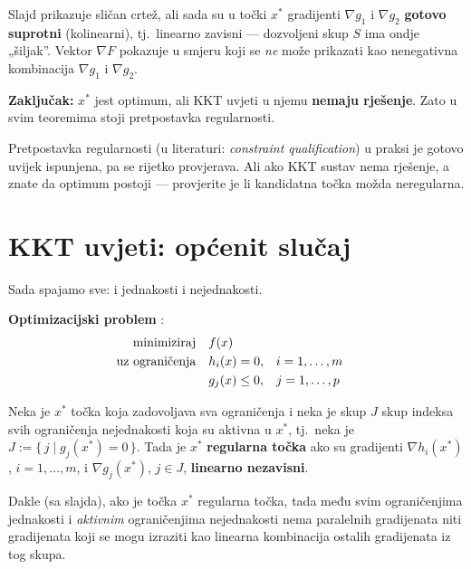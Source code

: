 Slajd prikazuje sličan crtež, ali sada su u točki $x^{*}$ gradijenti
$\nabla g_1$ i $\nabla g_2$ \textbf{gotovo suprotni} (kolinearni), tj.\ linearno
zavisni --- dozvoljeni skup $S$ ima ondje „šiljak”. Vektor $\nabla F$ pokazuje
u smjeru koji se \emph{ne} može prikazati kao nenegativna kombinacija
$\nabla g_1$ i $\nabla g_2$.

\textbf{Zaključak:} $x^{*}$ jest optimum, ali KKT uvjeti u njemu \textbf{nemaju
rješenje}. Zato u svim teoremima stoji pretpostavka regularnosti.

\begin{napomena}
Pretpostavka regularnosti (u literaturi: \emph{constraint qualification}) u
praksi je gotovo uvijek ispunjena, pa se rijetko provjerava. Ali ako KKT sustav
nema rješenje, a znate da optimum postoji --- provjerite je li kandidatna točka
možda neregularna.
\end{napomena}

\section{KKT uvjeti: općenit slučaj}
\label{sec:kkt}

Sada spajamo sve: i jednakosti i nejednakosti.

\textbf{Optimizacijski problem} :
\begin{equation}
\begin{aligned}
\minim & f(x) \\
\uzogr & h_i(x) = 0, && i = 1,\dots,m \\
       & g_j(x) \le 0, && j = 1,\dots,p
\end{aligned}
\end{equation}

\begin{definicija}
Neka je $x^{*}$ točka koja zadovoljava sva ograničenja i neka je skup $J$ skup
indeksa svih ograničenja nejednakosti koja su aktivna u $x^{*}$, tj.\ neka je
$J := \{\, j \mid g_j(x^{*}) = 0 \,\}$. Tada je $x^{*}$ \textbf{regularna
točka} ako su gradijenti $\nabla h_i(x^{*})$, $i = 1,\dots,m$, i
$\nabla g_j(x^{*})$, $j \in J$, \textbf{linearno nezavisni}.
\end{definicija}

Dakle (sa slajda), ako je točka $x^{*}$ regularna točka, tada među svim
ograničenjima jednakosti i \emph{aktivnim} ograničenjima nejednakosti nema
paralelnih gradijenata niti gradijenata koji se mogu izraziti kao linearna
kombinacija ostalih gradijenata iz tog skupa.

